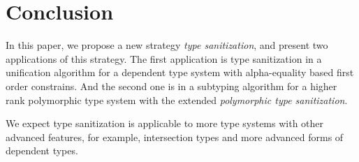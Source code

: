 \section{Conclusion}

In this paper, we propose a new strategy \textit{type sanitization}, and present
two applications of this strategy. The first application is type sanitization in
a unification algorithm for a dependent type system with alpha-equality based
first order constrains. And the second one is in a subtyping algorithm for a
higher rank polymorphic type system with the extended \textit{polymorphic type
  sanitization}.

We expect type sanitization is applicable to more type systems with other
advanced features, for example, intersection types and more advanced
forms of dependent types.
